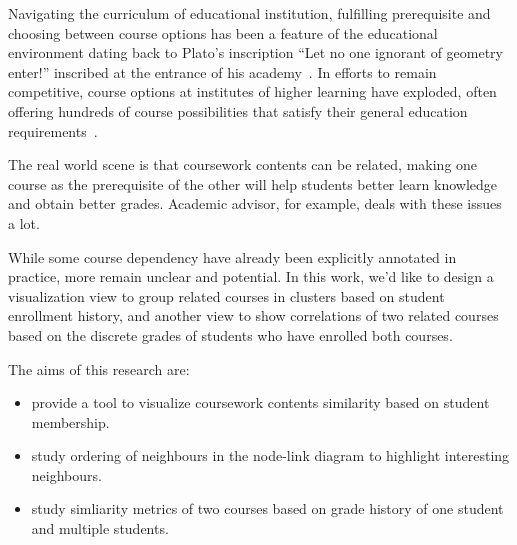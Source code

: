 
Navigating the curriculum of educational institution, fulfilling prerequisite and choosing between course options has been a feature of the educational environment dating back to Plato’s inscription ``Let no one ignorant of geometry enter!'' inscribed at the entrance of his academy~\cite{anglin1994mathematics}. In efforts to remain competitive, course options at institutes of higher learning have exploded, often offering hundreds of course possibilities that satisfy their general education requirements~\cite{schwartz2009paradox}.

The real world scene is that coursework contents can be related, making one course as the prerequisite of the other will help students better learn knowledge and obtain better grades. Academic advisor, for example, deals with these issues a lot.

While some course dependency have already been explicitly annotated in practice, more remain unclear and potential. In this work, we’d like to design a visualization view to group related courses in clusters based on student enrollment history, and another view to show correlations of two related courses based on the discrete grades of students who have enrolled both courses.

The aims of this research are:
\begin{itemize}
  \item provide a tool to visualize coursework contents similarity based on student membership.
  \item study ordering of neighbours in the node-link diagram to highlight interesting neighbours. 
  \item study simliarity metrics of two courses based on grade history of one student and multiple students.
\end{itemize}
